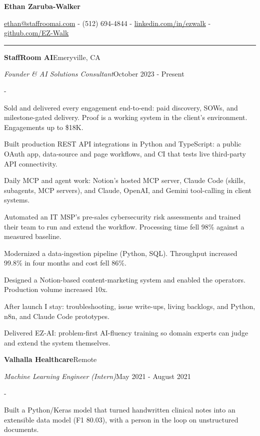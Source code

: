 \documentclass[10pt,letterpaper]{article}
\newenvironment{cvitems}{%
  \begin{list}{-}{%
    \setlength{\leftmargin}{12pt}%
    \setlength{\itemsep}{1.2pt}%
    \setlength{\parsep}{0pt}%
    \setlength{\topsep}{1.5pt}%
    \setlength{\partopsep}{0pt}%
    \setlength{\labelwidth}{6pt}%
    \setlength{\labelsep}{6pt}%
    \setlength{\itemindent}{0pt}%
  }%
}{\end{list}}
\newcommand{\cvsection}[1]{%
  \vspace{7pt}%
  \noindent{\bfseries\fontsize{11pt}{13pt}\selectfont\MakeUppercase{#1}}\par
  \vspace{1pt}%
  \noindent\rule{\textwidth}{0.4pt}\par
  \vspace{4pt}%
}
\newcommand{\cventryhead}[4]{%
  \noindent\textbf{#1}\hfill#2\par
  \vspace{0.5pt}%
  \noindent\textit{#3}\hfill#4\par
}
\begin{document}
\begin{center}
  {\bfseries\fontsize{22pt}{24pt}\selectfont Ethan Zaruba-Walker\par}
  \vspace{4pt}
  {\fontsize{10pt}{12pt}\selectfont
    \href{mailto:ethan@staffroomai.com}{ethan@staffroomai.com}
    {-}
    (512) 694-4844
    {-}
    \href{https://linkedin.com/in/ezwalk}{linkedin.com/in/ezwalk}
    {-}
    \href{https://github.com/EZ-Walk}{github.com/EZ-Walk}\par}
\end{center}
\vspace{2pt}

\cvsection{Experience}

\cventryhead{StaffRoom AI}{Emeryville, CA}
{Founder \& AI Solutions Consultant}{October 2023 - Present}
\begin{cvitems}
  \item Sold and delivered every engagement end-to-end: paid discovery, SOWs, and milestone-gated delivery. Proof is a working system in the client's environment. Engagements up to \$18K.
  \item Built production REST API integrations in Python and TypeScript: a public OAuth app, data-source and page workflows, and CI that tests live third-party API connectivity.
  \item Daily MCP and agent work: Notion's hosted MCP server, Claude Code (skills, subagents, MCP servers), and Claude, OpenAI, and Gemini tool-calling in client systems.
  \item Automated an IT MSP's pre-sales cybersecurity risk assessments and trained their team to run and extend the workflow. Processing time fell 98\% against a measured baseline.
  \item Modernized a data-ingestion pipeline (Python, SQL). Throughput increased 99.8\% in four months and cost fell 86\%.
  \item Designed a Notion-based content-marketing system and enabled the operators. Production volume increased 10x.
  \item After launch I stay: troubleshooting, issue write-ups, living backlogs, and Python, n8n, and Claude Code prototypes.
  \item Delivered EZ-AI: problem-first AI-fluency training so domain experts can judge and extend the system themselves.
\end{cvitems}

\vspace{3pt}
\cventryhead{Valhalla Healthcare}{Remote}
{Machine Learning Engineer (Intern)}{May 2021 - August 2021}
\begin{cvitems}
  \item Built a Python/Keras model that turned handwritten clinical notes into an extensible data model (F1 80.03), with a person in the loop on unstructured documents.
\end{cvitems}
\end{document}
